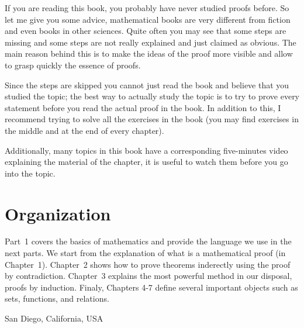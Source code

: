 If you are reading this book, you probably have never studied proofs before. So let me give you some advice, mathematical books are very different from fiction and even books in other sciences. Quite often you may see that some steps are missing and some steps are not really explained and just claimed as obvious.  The main reason behind this is to make the ideas of the proof more visible and allow to grasp quickly the essence of proofs.

Since the steps are skipped you cannot just read the book and believe that you studied the topic;  the best way to actually study the topic is to try to prove every statement before you read the actual proof in the book. In addition to this, I recommend trying to solve all the exercises in the book (you may find exercises in the middle and at the end of every chapter).

Additionally, many topics in this book have a corresponding five-minutes video explaining the material of the chapter, it is useful to watch them before you go into the topic.

\section*{Organization}
Part~1 covers the basics of mathematics and provide the language we use in the
next parts. We start from the explanation of what is a mathematical proof (in Chapter~1). Chapter~2 shows how to prove theorems inderectly using the proof by contradiction. Chapter~3 explains the most powerful method in our disposal, proofs by induction. Finaly, Chapters 4-7 define several important objects such as sets, functions, and relations.


San Diego, California, USA
